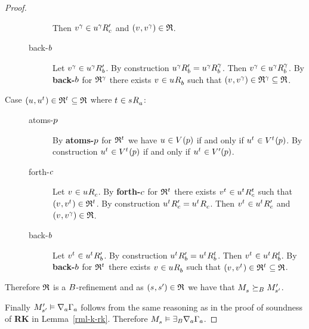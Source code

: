 \begin{proof}
\begin{description}
\begin{description}
                Then $\kStateV[\gamma] \in \kSuccessorsPC{\kStateU[\gamma]}$ and $(\kStateV, \kStateV[\gamma]) \in \refinement$.
            \item[back-$\agentB$]
                Let $\kStateV[\gamma] \in \kSuccessorsPB{\kStateU[\gamma]}$.
                By construction $\kSuccessorsPB{\kStateU[\gamma]} = \kSuccessorsB[\gamma]{\kStateU[\gamma]}$.
                Then $\kStateV[\gamma] \in \kSuccessorsB[\gamma]{\kStateU[\gamma]}$.
                By {\bf back-$\agentB$} for $\refinement^{\gamma}$ there exists $\kStateV \in \kSuccessorsB{\kStateU}$ such that $(\kStateV, \kStateV[\gamma]) \in \refinement^{\gamma} \subseteq \refinement$.
        \end{description}
    \item[{Case $(\kStateU, \kStateU[\kStateT]) \in \refinement^{\kStateT} \subseteq \refinement$ where $\kStateT \in \kSuccessorsA{\kStateS}$:}]
        \hfill
        \begin{description}
            \item[atoms-$\atomP$] 
                By {\bf atoms-$\atomP$} for $\refinement^{\kStateT}$ we have $\kStateU \in \kValuation(\atomP)$ if and only if $\kStateU[\kStateT] \in \kValuation[\kStateT](\atomP)$.
                By construction $\kStateU[\kStateT] \in \kValuation[\kStateT](\atomP)$ if and only if $\kStateU[\kStateT] \in \kValuationP(\atomP)$.
            \item[forth-$\agentC$]
                Let $\kStateV \in \kSuccessorsC{\kStateU}$.
                By {\bf forth-$\agentC$} for $\refinement^{\kStateT}$ there exists $\kStateV[\kStateT] \in \kSuccessorsC[\kStateT]{\kStateU[\kStateT]}$ such that $(\kStateV, \kStateV[\kStateT]) \in \refinement^{\kStateT}$.
                By construction $\kSuccessorsPC{\kStateU[\kStateT]} = \kSuccessorsC{\kStateU[\kStateT]}$.
                Then $\kStateV[\kStateT] \in \kSuccessorsPC{\kStateU[\kStateT]}$ and $(\kStateV, \kStateV[\gamma]) \in \refinement$.
            \item[back-$\agentB$]
                Let $\kStateV[\kStateT] \in \kSuccessorsPB{\kStateU[\kStateT]}$.
                By construction $\kSuccessorsPB{\kStateU[\kStateT]} = \kSuccessorsB[\kStateT]{\kStateU[\kStateT]}$.
                Then $\kStateV[\kStateT] \in \kSuccessorsB[\kStateT]{\kStateU[\kStateT]}$.
                By {\bf back-$\agentB$} for $\refinement^{\kStateT}$ there exists $\kStateV \in \kSuccessorsB{\kStateU}$ such that $(\kStateV, \kStateV[\kStateT]) \in \refinement^{\kStateT} \subseteq \refinement$.
        \end{description}
\end{description}

Therefore $\refinement$ is a $\agentsB$-refinement and as $(\kStateS, \kStateSP) \in \refinement$ we have that $\kPModel{\kStateS} \simulatesBs \kPModelP{\kStateSP}$.

Finally $\kPModelP{\kStateSP} \entails \coversA \Gamma_\agentA$ follows from the same reasoning as in the proof of soundness of {\bf RK} in Lemma~\ref{rml-k-rk}.
Therefore $\kPModel{\kStateS} \entails \somerefsBs \coversA \Gamma_\agentA$.
\end{proof}

